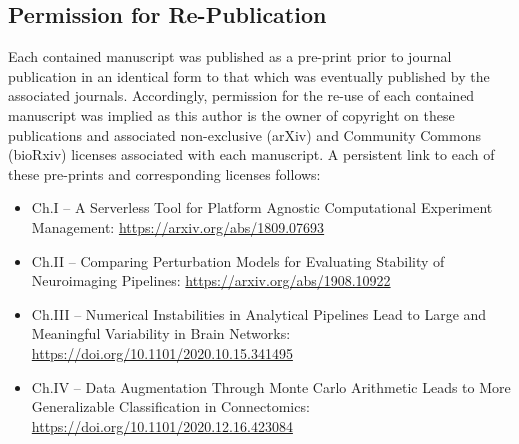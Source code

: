 \subsection{Permission for Re-Publication}
Each contained manuscript was published as a pre-print prior to journal publication in an identical form to that which
was eventually published by the associated journals. Accordingly, permission for the re-use of each contained
manuscript was implied as this author is the owner of copyright on these publications and associated non-exclusive
(arXiv) and Community Commons (bioRxiv) licenses associated with each manuscript. A persistent link to each of these
pre-prints and corresponding licenses follows:

\begin{itemize}
\item Ch.I – A Serverless Tool for Platform Agnostic Computational Experiment Management:
\url{https://arxiv.org/abs/1809.07693}
\item Ch.II – Comparing Perturbation Models for Evaluating Stability of Neuroimaging Pipelines:
\url{https://arxiv.org/abs/1908.10922}
\item Ch.III – Numerical Instabilities in Analytical Pipelines Lead to Large and Meaningful Variability in Brain
Networks: \url{https://doi.org/10.1101/2020.10.15.341495}
\item Ch.IV – Data Augmentation Through Monte Carlo Arithmetic Leads to More Generalizable Classification in
Connectomics: \url{https://doi.org/10.1101/2020.12.16.423084}
\end{itemize}

\clearpage
